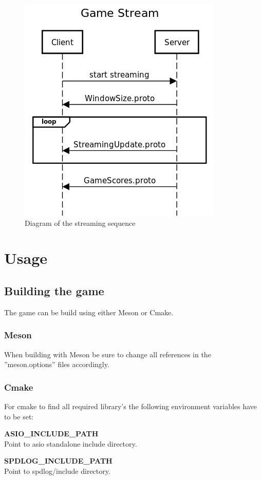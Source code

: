 \documentclass[12pt]{report}
\begin{document}
\begin{figure}[h]
\centering
\includegraphics[scale = 0.5]{sequence_diagrm.png}
\caption{Diagram of the streaming sequence}
\medskip
\end{figure}

\section{Usage}

\subsection{Building the game}
The game can be build using either Meson or Cmake.

\subsubsection{Meson}
When building with Meson be sure to change all references in the ''meson.options'' files accordingly.

\subsubsection{Cmake}
For cmake to find all required library's the following environment variables have to be set:

\textbf{ASIO\_INCLUDE\_PATH} \\
Point to asio standalone include directory.

\textbf{SPDLOG\_INCLUDE\_PATH} \\
Point to spdlog/include directory.
\end{document}
